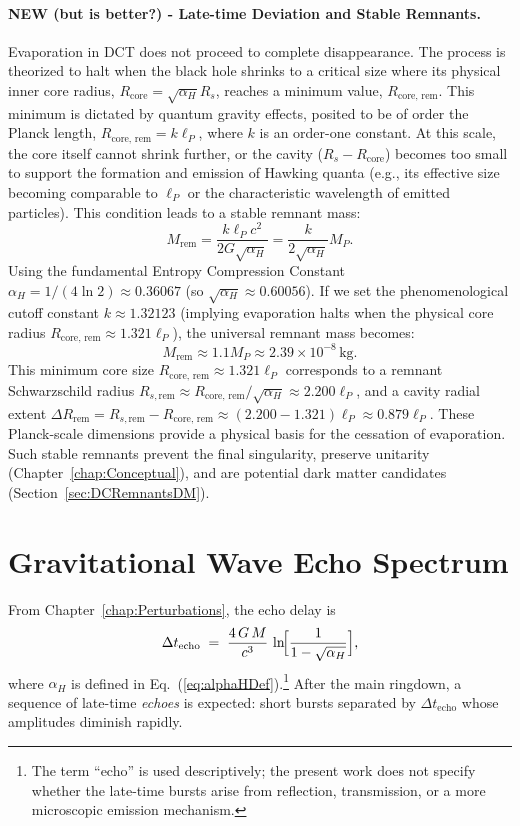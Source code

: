 \documentclass[a4paper, 12pt, oneside]{book}
\numberwithin{equation}{chapter}
\begin{document}
\paragraph{NEW (but is better?) - Late-time Deviation and Stable Remnants.}
Evaporation in DCT does not proceed to complete disappearance. The process is theorized to halt when the black hole shrinks to a critical size where its physical inner core radius, $R_{\text{core}} = \sqrt{\alpha_H} R_s$, reaches a minimum value, $R_{\text{core, rem}}$. This minimum is dictated by quantum gravity effects, posited to be of order the Planck length, $R_{\text{core, rem}} = k \ell_P$, where $k$ is an order-one constant. At this scale, the core itself cannot shrink further, or the cavity ($R_s - R_{\text{core}}$) becomes too small to support the formation and emission of Hawking quanta (e.g., its effective size becoming comparable to $\ell_P$ or the characteristic wavelength of emitted particles). This condition leads to a stable remnant mass:
\[
    M_{\text{rem}} = \frac{k \ell_P c^2}{2G\sqrt{\alpha_H}} = \frac{k}{2\sqrt{\alpha_H}} M_P.
\]
Using the fundamental Entropy Compression Constant $\alpha_H = 1/(4\ln 2) \approx 0.36067$ (so $\sqrt{\alpha_H} \approx 0.60056$). If we set the phenomenological cutoff constant $k \approx 1.32123$ (implying evaporation halts when the physical core radius $R_{\text{core, rem}} \approx 1.321 \ell_P$), the universal remnant mass becomes:
\[
    M_{\text{rem}} \approx 1.1 M_P \approx 2.39 \times 10^{-8}\,\mathrm{kg}. 
\]
This minimum core size $R_{\text{core, rem}} \approx 1.321 \ell_P$ corresponds to a remnant Schwarzschild radius $R_{s, \text{rem}} \approx R_{\text{core, rem}}/\sqrt{\alpha_H} \approx 2.200 \ell_P$, and a cavity radial extent $\Delta R_{\text{rem}} = R_{s, \text{rem}} - R_{\text{core, rem}} \approx (2.200 - 1.321)\ell_P \approx 0.879 \ell_P$. These Planck-scale dimensions provide a physical basis for the cessation of evaporation. Such stable remnants prevent the final singularity, preserve unitarity (Chapter~\ref{chap:Conceptual}), and are potential dark matter candidates (Section~\ref{sec:DCRemnantsDM}).

\section{Gravitational Wave Echo Spectrum}
\label{sec:EchoSpectrum}

From Chapter~\ref{chap:Perturbations}, the echo delay is
\[
    \Delta t_{\text{echo}} \;=\;
    \frac{4\,G\,M}{c^{3}}
    \,\ln\!\Bigl[\frac{1}{1-\sqrt{\alpha_H}}\Bigr],
    \label{eq:DeltaTEchoFormula}
\]
where \(\alpha_H\) is defined in Eq.~(\ref{eq:alphaHDef}).\footnote{The term ``echo'' is used descriptively; the present work
does not specify whether the late-time bursts arise from reflection,
transmission, or a more microscopic emission mechanism.}
After the main ringdown, a sequence of late-time \emph{echoes} is
expected: short bursts separated by \(\Delta t_{\text{echo}}\) whose
amplitudes diminish rapidly.
\end{document}
